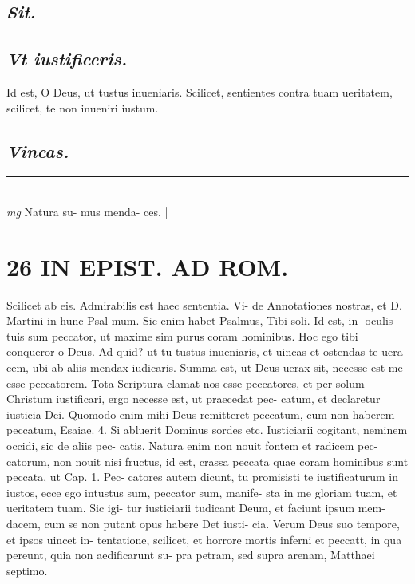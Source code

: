 \documentclass{article}
\begin{document}
\begin{pages}
\subsection*{\textit{Sit. }}
{}
\subsection*{\textit{Vt iustificeris. }}\pstart Id est, O Deus, ut tustus inueniaris.  \pend\pstart Scilicet, sentientes contra tuam ueritatem, scilicet, te non inueniri iustum.  \pend
{}
{}
\subsection*{\textit{Vincas. }}
\vspace{0.5cm}\noindent
\vspace{0.2cm}\rule{1cm}{0.2pt}\\ 
\hspace{0.2cm}\textit{mg}
\footnotesize Natura su- mus menda- ces.  
\normalsize| 
\section*{26 IN EPIST. AD ROM.  }
\marginpar{[ p.]}\pstart Scilicet ab eis. Admirabilis est haec sententia. Vi- de Annotationes nostras, et D. Martini in hunc Psal mum. Sic enim habet Psalmus, Tibi soli. Id est, in- oculis tuis sum peccator, ut maxime sim purus coram hominibus. Hoc ego tibi conqueror o Deus. Ad quid? ut tu tustus inueniaris, et uincas et ostendas te uera- cem, ubi ab aliis mendax iudicaris. Summa est, ut Deus uerax sit, necesse est me esse peccatorem. Tota Scriptura clamat nos esse peccatores, et per solum Christum iustificari, ergo necesse est, ut praecedat pec- catum, et declaretur iusticia Dei. Quomodo enim mihi Deus remitteret peccatum, cum non haberem peccatum, Esaiae. 4. Si abluerit Dominus sordes etc.  Iusticiarii cogitant, neminem occidi, sic de aliis pec- catis. Natura enim non nouit fontem et radicem pec- catorum, non nouit nisi fructus, id est, crassa peccata quae coram hominibus sunt peccata, ut Cap. 1. Pec- catores autem dicunt, tu promisisti te iustificaturum in iustos, ecce ego intustus sum, peccator sum, manife- sta in me gloriam tuam, et ueritatem tuam. Sic igi- tur iusticiarii tudicant Deum, et faciunt ipsum mem- dacem, cum se non putant opus habere Det iusti- cia. Verum Deus suo tempore, et ipsos uincet in- tentatione, scilicet, et horrore mortis inferni et peccatt, in qua pereunt, quia non aedificarunt su- pra petram, sed supra arenam, Matthaei septimo.      \pend
{}
{}

\end{pages}
\end{document}

